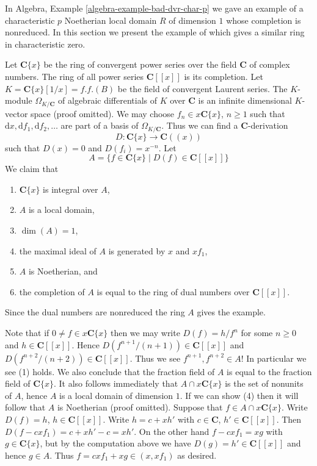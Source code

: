 \noindent
In Algebra, Example \ref{algebra-example-bad-dvr-char-p} we gave an example
of a characteristic $p$ Noetherian local domain $R$ of dimension $1$
whose completion is nonreduced. In this section we present the example
of \cite[Proposition 3.1]{Ferrand-Raynaud} which gives a similar
ring in characteristic zero.

\medskip\noindent
Let $\mathbf{C}\{x\}$ be the ring of convergent power series over
the field $\mathbf{C}$ of complex numbers. The ring of all power series
$\mathbf{C}[[x]]$ is its completion. Let $K = \mathbf{C}\{x\}[1/x] = f.f.(B)$
be the field of convergent Laurent series. The $K$-module
$\Omega_{K/\mathbf{C}}$ of algebraic differentials
of $K$ over $\mathbf{C}$ is an infinite dimensional $K$-vector space
(proof omitted). We may choose $f_n \in x\mathbf{C}\{x\}$,
$n \geq 1$ such that
$
\text{d}x, \text{d}f_1, \text{d}f_2, \ldots
$
are part of a basis of $\Omega_{K/\mathbf{C}}$. Thus we can
find a $\mathbf{C}$-derivation
$$
D : \mathbf{C}\{x\} \longrightarrow \mathbf{C}((x))
$$
such that $D(x) = 0$ and $D(f_i) = x^{-n}$. Let
$$
A = \{f \in \mathbf{C}\{x\} \mid D(f) \in \mathbf{C}[[x]]\}
$$
We claim that
\begin{enumerate}
\item $\mathbf{C}\{x\}$ is integral over $A$,
\item $A$ is a local domain,
\item $\dim(A) = 1$,
\item the maximal ideal of $A$ is generated by $x$ and $xf_1$,
\item $A$ is Noetherian, and
\item the completion of $A$ is equal to the ring of dual numbers
over $\mathbf{C}[[x]]$.
\end{enumerate}
Since the dual numbers are nonreduced the ring $A$ gives the example.

\medskip\noindent
Note that if $0 \not = f \in x\mathbf{C}\{x\}$ then
we may write $D(f) = h/f^n$ for some $n \geq 0$ and $h \in \mathbf{C}[[x]]$.
Hence $D(f^{n + 1}/(n + 1)) \in \mathbf{C}[[x]]$
and $D(f^{n + 2}/(n + 2)) \in \mathbf{C}[[x]]$. Thus we
see $f^{n + 1}, f^{n + 2} \in A$!
In particular we see (1) holds. We also conclude that
the fraction field of $A$ is equal to the fraction field of
$\mathbf{C}\{x\}$. It also follows immediately that
$A \cap x\mathbf{C}\{x\}$ is the set of nonunits of $A$, hence
$A$ is a local domain of dimension $1$. If we can show (4)
then it will follow that $A$ is Noetherian (proof omitted).
Suppose that $f \in A \cap x\mathbf{C}\{x\}$. Write
$D(f) = h$, $h \in \mathbf{C}[[x]]$. Write $h = c + xh'$
with $c \in \mathbf{C}$, $h' \in \mathbf{C}[[x]]$. Then
$D(f - cxf_1) = c + xh' - c = xh'$. On the other hand
$f - cxf_1 = xg$ with $g \in \mathbf{C}\{x\}$, but by the
computation above we have $D(g) = h' \in \mathbf{C}[[x]]$
and hence $g \in A$. Thus $f = cxf_1 + xg \in (x, xf_1)$ as desired.

